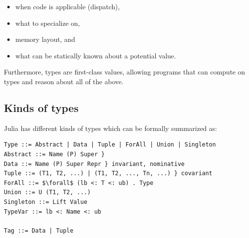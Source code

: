 \documentclass[pldi]{sigplanconf-pldi15}
\begin{document}
\begin{itemize}
\item when code is applicable (dispatch),
\item what to specialize on,
\item memory layout, and
\item what can be statically known about a potential value.
\end{itemize}
%
Furthermore, types are first-class values, allowing programs that can compute
on types and reason about all of the above.


\subsection{Kinds of types}

Julia has different kinds of types which can be formally summarized as:

\begin{lstlisting}
Type ::= Abstract | Data | Tuple | ForAll | Union | Singleton
Abstract ::= Name (P) Super }
Data ::= Name (P) Super Repr } invariant, nominative
Tuple ::= (T1, T2, ...) | (T1, T2, ..., Tn, ...) } covariant
ForAll ::= $\forall$ (lb <: T <: ub) . Type
Union ::= U (T1, T2, ...)
Singleton ::= Lift Value
TypeVar ::= lb <: Name <: ub

Tag ::= Data | Tuple
\end{lstlisting}
\end{document}
